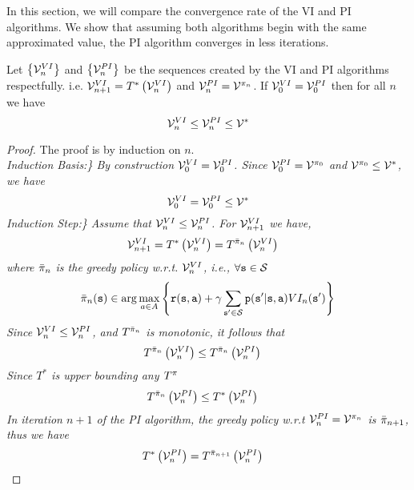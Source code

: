 In this section, we will compare the convergence rate of the VI and
PI algorithms. We show that assuming both algorithms begin
with the same approximated value, the PI algorithm converges in less
iterations.
\begin{theorem}
\label{L6:PIVI-ComparisonTh} Let $\left\{ \mathcal{V}_{n}^{VI}\right\} $ and $\left\{ \mathcal{V}_{n}^{PI}\right\} $
be the sequences created by the VI and PI algorithms respectfully.
i.e. $\mathcal{V}_{n+1}^{VI}=T^{*}\left(\mathcal{V}_{n}^{VI}\right)$ and $\mathcal{V}_{n}^{PI}=\mathcal{V}^{\pi_{n}}$.
If $\mathcal{V}_{0}^{VI}=\mathcal{V}_{0}^{PI}$ then for all $n$ we have 
\[
\mathcal{V}_{n}^{VI}\leq\mathcal{V}_{n}^{PI}\leq\mathcal{V}^{*}
\]
\end{theorem}

\begin{proof} The proof is by induction on $n$.\\
{\em Induction Basis:\} By
construction $\mathcal{V}_{0}^{VI}=\mathcal{V}_{0}^{PI}$. Since $\mathcal{V}_{0}^{PI}=\mathcal{V}^{\pi_{0}}$
and $\mathcal{V}^{\pi_{0}}\leq\mathcal{V}^{*}$, we have
\[
\mathcal{V}_{0}^{VI}=\mathcal{V}_{0}^{PI}\leq\mathcal{V}^{*}
\]
{\em Induction Step:\} Assume
that $\mathcal{V}_{n}^{VI}\leq\mathcal{V}_{n}^{PI}$. For $\mathcal{V}_{n+1}^{VI}$
we have,
\begin{align*}
\mathcal{V}_{n+1}^{VI} & =T^{*}\left(\mathcal{V}_{n}^{VI}\right)=T^{\bar{\pi}_{n}}\left(\mathcal{V}_{n}^{VI}\right)
\end{align*}
where $\bar{\pi}_{n}$ is the greedy policy w.r.t. $\mathcal{V}_{n}^{VI}$,
i.e., $\forall{\tt s}\in\mathcal{S}$
\[
\bar{\pi}_{n}({\tt s})\in\arg\max_{a\in A}\left\{ {\tt r}({\tt s},{\tt a})+\gamma\sum_{{\tt s}'\in\mathcal{S}}{\tt p}({\tt s}'|{\tt s},{\tt a})VI_{n}({\tt s}')\right\} 
\]
Since $\mathcal{V}_{n}^{VI}\leq\mathcal{V}_{n}^{PI}$, and $T^{\bar{\pi}_{n}}$
is monotonic, it follows that
\begin{align*}
T^{\bar{\pi}_{n}}\left(\mathcal{V}_{n}^{VI}\right) & \leq T^{\bar{\pi}_{n}}\left(\mathcal{V}_{n}^{PI}\right)
\end{align*}
 Since $T^{*}$ is upper bounding any $T^{\pi}$
\begin{align*}
T^{\bar{\pi}_{n}}\left(\mathcal{V}_{n}^{PI}\right) & \leq T^{*}\left(\mathcal{V}_{n}^{PI}\right)
\end{align*}
In iteration $n+1$ of the PI algorithm, the greedy policy w.r.t $\mathcal{V}_{n}^{PI}=\mathcal{V}^{\pi_{n}}$
is $\bar{\pi}_{n+1}$, thus we have
\begin{align*}
T^{*}\left(\mathcal{V}_{n}^{PI}\right) & =T^{\bar{\pi}_{n+1}}\left(\mathcal{V}_{n}^{PI}\right)
\end{align*}
}}
\end{proof}
